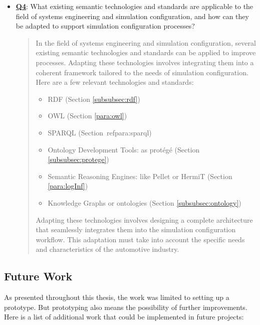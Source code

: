 \begin{itemize}
    \item \hyperref[Q4]{\textbf{Q4}}: What existing semantic technologies and standards are applicable to the field of systems engineering and simulation configuration, and how can they be adapted to support simulation configuration processes?
    \begin{quote}
        In the field of systems engineering and simulation configuration, several existing semantic technologies and standards can be applied to improve processes. Adapting these technologies involves integrating them into a coherent framework tailored to the needs of simulation configuration. Here are a few relevant technologies and standards:
         \begin{itemize}
             \item RDF (Section \ref{subsubsec:rdf})
             \item OWL (Section \ref{para:owl})
             \item SPARQL (Section\ ref{para:sparql})
             \item Ontology Development Tools: as protégé (Section \ref{subsubsec:protege})
             \item Semantic Reasoning Engines: like Pellet or HermiT (Section \ref{para:logInf})
             \item Knowledge Graphs or ontologies (Section \ref{subsubsec:ontology})
         \end{itemize}
        
        Adapting these technologies involves designing a complete architecture that seamlessly integrates them into the simulation configuration workflow. This adaptation must take into account the specific needs and characteristics of the automotive industry.
    \end{quote}
\end{itemize}


 
\subsection{Future Work}
As presented throughout this thesis, the work was limited to setting up a prototype. But prototyping also means the possibility of further improvements. Here is a list of additional work that could be implemented in future projects:

